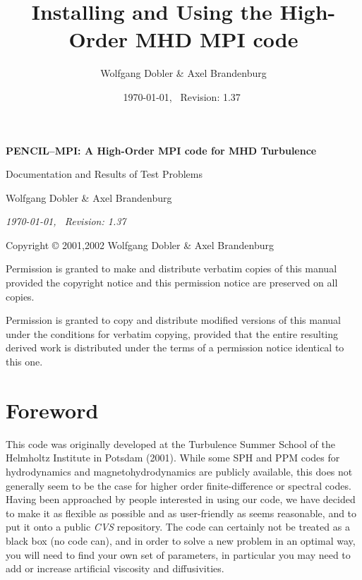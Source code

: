 \documentclass[12pt,twoside,notitlepage,a4paper]{article}
\title{{\sffamily\bfseries Installing and Using the High-Order MHD MPI code}}
\author{Wolfgang Dobler \& Axel Brandenburg}
\date{\today,~ $ $Revision: 1.37 $ $}
\newcommand{\name}[1]{\textsl{#1}\index{#1}\/}
\begin{document}
\pagestyle{empty}


\begin{titlepage}
  \begin{center}

  \large

  \vspace*{3cm}

  {\Large\sffamily\bfseries PENCIL--MPI: A High-Order MPI code for MHD Turbulence}

  \vspace{0.5cm}

  {\sffamily Documentation and Results of Test Problems}

  \vspace{1.5cm}

  {Wolfgang Dobler \& Axel Brandenburg}


  \vspace{2cm}

  \emph{\today,~ $ $Revision: 1.37 $ $}


\end{center}

\end{titlepage}


\newpage
\mbox{}
\vfill

Copyright \copyright{} 2001,2002 Wolfgang Dobler \& Axel Brandenburg
\bigskip

Permission is granted to make and distribute verbatim copies of
this manual provided the copyright notice and this permission notice
are preserved on all copies.

Permission is granted to copy and distribute modified versions
of this manual under the conditions for verbatim copying,
provided that the entire resulting derived work is distributed under the
terms of a permission notice identical to this one.


\clearpage
\pagestyle{plain}

\section*{Foreword}

This code was originally developed at the Turbulence Summer School of the
Helmholtz Institute in Potsdam (2001).
While some SPH and PPM codes for hydrodynamics and magnetohydrodynamics
are publicly available, this does not generally seem to be
the case for higher order finite-difference or spectral codes.
Having been approached by people interested in using our code, we have
decided to make it as flexible as possible and as user-friendly as seems
reasonable, and to put it onto a public \name{CVS} repository.
The code can certainly not be treated as a black box (no code can), and in
order to solve a new problem in an optimal way, you will need to find your
own set of parameters, in particular you may need to add or increase
artificial viscosity and diffusivities.
\end{document}
